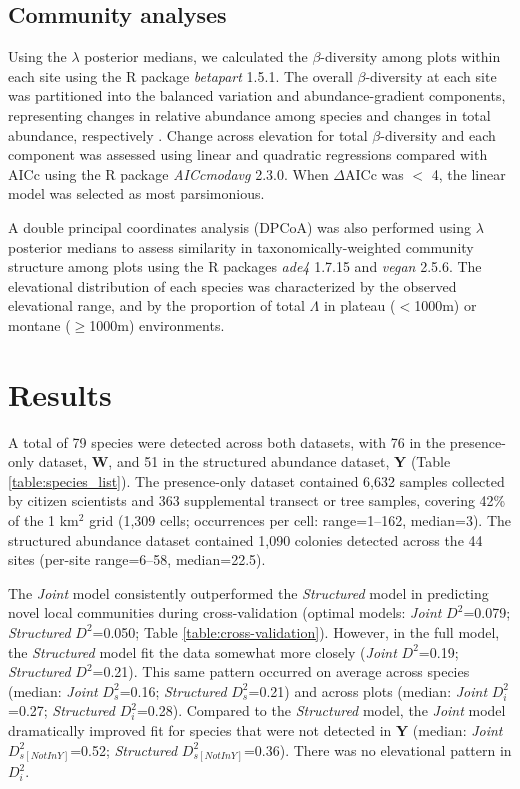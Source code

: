 \documentclass[preprint,review,times,12pt,3p]{elsarticle}
\begin{document}
\subsection{Community analyses}
Using the $\lambda$ posterior medians, we calculated the $\beta$-diversity among plots within each site using the R package \emph{betapart} 1.5.1. The overall $\beta$-diversity at each site was partitioned into the balanced variation and abundance-gradient components, representing changes in relative abundance among species and changes in total abundance, respectively \citep{Baselga2017}. Change across elevation for total $\beta$-diversity and each component was assessed using linear and quadratic regressions compared with AICc using the R package \emph{AICcmodavg} 2.3.0. When $\Delta$AICc was $<$ 4, the linear model was selected as most parsimonious. 

A double principal coordinates analysis (DPCoA) was also performed using $\lambda$ posterior medians to assess similarity in taxonomically-weighted community structure among plots \citep{Dray2015,Pavoine2019} using the R packages \emph{ade4} 1.7.15 and \emph{vegan} 2.5.6. The elevational distribution of each species was characterized by the observed elevational range, and by the proportion of total $\Lambda$ in plateau ($<$1000m) or montane ($\geq$1000m) environments.




\section{Results}
\label{S:3}
A total of 79 species were detected across both datasets, with 76 in the presence-only dataset, \textbf{W}, and 51 in the structured abundance dataset, \textbf{Y} (Table \ref{table:species_list}). The presence-only dataset contained 6,632 samples collected by citizen scientists and 363 supplemental transect or tree samples, covering 42\% of the 1 km$^2$ grid (1,309 cells; occurrences per cell: range=1–162, median=3). The structured abundance dataset contained 1,090 colonies detected across the 44 sites (per-site range=6–58, median=22.5). 

The \emph{Joint} model consistently outperformed the \emph{Structured} model in predicting novel local communities during cross-validation (optimal models: \emph{Joint} $D^2$=0.079; \emph{Structured} $D^2$=0.050; Table \ref{table:cross-validation}). However, in the full model, the \emph{Structured} model fit the data somewhat more closely (\emph{Joint} $D^2$=0.19; \emph{Structured} $D^2$=0.21). This same pattern occurred on average across species (median: \emph{Joint} $D^2_s$=0.16; \emph{Structured} $D^2_s$=0.21) and across plots (median: \emph{Joint} $D^2_i$=0.27; \emph{Structured} $D^2_i$=0.28). Compared to the \emph{Structured} model, the \emph{Joint} model dramatically improved fit for species that were not detected in \textbf{Y} (median: \emph{Joint} $D^2_{s[Not In Y]}$=0.52; \emph{Structured} $D^2_{s[Not In Y]}$=0.36). There was no elevational pattern in $D^2_i$.
\end{document}
